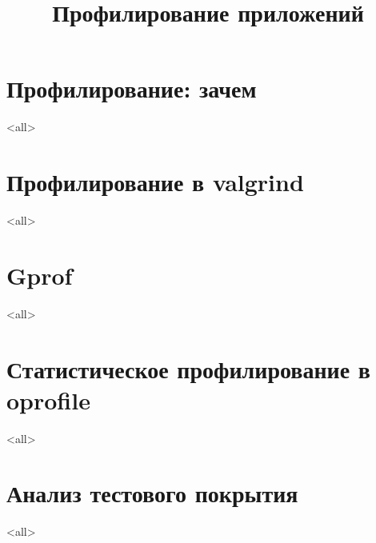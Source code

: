 

\title[Profiling]{Профилирование приложений}





\begin{frame}
	\frametitle{}
	\titlepage
	\vspace{-0.5cm}
	\begin{center}
	\end{center}
\end{frame}

\begin{frame}
	\tableofcontents
\end{frame}




\section{Профилирование: зачем}
\mode<all>{}

\section{Профилирование в valgrind}
\mode<all>{}

\section{Gprof}
\mode<all>{}

\section[oprofile]{Статистическое профилирование в oprofile}
\mode<all>{}

\section{Анализ тестового покрытия}
\mode<all>{}


